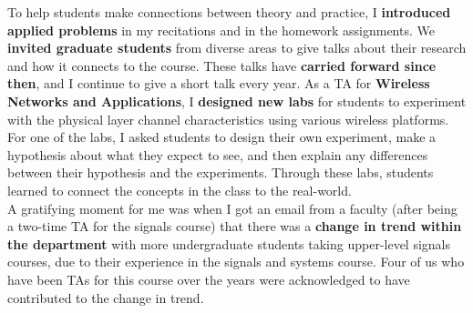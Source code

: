 \documentclass[10pt]{article}
\begin{document}
To help students make connections between theory and practice,  I \textbf{introduced applied problems} in my recitations and in the homework assignments. We \textbf{invited graduate students} from diverse areas to give talks about their research and how it connects to the course. These talks have \textbf{carried forward since then}, and I continue to give a short talk every year.
As a TA for \textbf{Wireless Networks and Applications}, I \textbf{designed new labs} for students to experiment with the physical layer channel characteristics using various wireless platforms. 
For one of the labs, I asked students to design their own experiment, make a hypothesis about what they expect to see, and then explain any differences between their hypothesis and the experiments. %
Through these labs, students learned to connect the concepts in the class to the real-world. \\%

A gratifying moment for me was when I got an email from a faculty (after being a two-time TA for the signals course)
that there was a \textbf{change in trend within the department} with more undergraduate students taking upper-level signals courses, due to their experience in the signals and systems course. Four of us who have been TAs for this course over the years were acknowledged to have contributed to the change in trend.\\
\vspace{-12pt}
\end{document}
